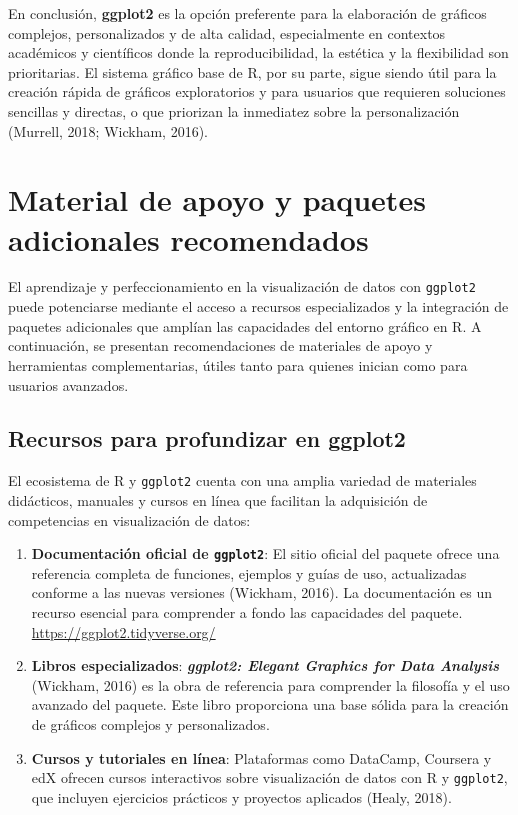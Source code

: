 \documentclass[
  spanish,
  a4paper,
  DIV=11,
  numbers=noendperiod,
  onepage,
  openany]{scrreprt}
\begin{document}
En conclusión, \textbf{ggplot2} es la opción preferente para la
elaboración de gráficos complejos, personalizados y de alta calidad,
especialmente en contextos académicos y científicos donde la
reproducibilidad, la estética y la flexibilidad son prioritarias. El
sistema gráfico base de R, por su parte, sigue siendo útil para la
creación rápida de gráficos exploratorios y para usuarios que requieren
soluciones sencillas y directas, o que priorizan la inmediatez sobre la
personalización (Murrell, 2018; Wickham, 2016).

\section{Material de apoyo y paquetes adicionales
recomendados}\label{material-de-apoyo-y-paquetes-adicionales-recomendados}

El aprendizaje y perfeccionamiento en la visualización de datos con
\texttt{ggplot2} puede potenciarse mediante el acceso a recursos
especializados y la integración de paquetes adicionales que amplían las
capacidades del entorno gráfico en R. A continuación, se presentan
recomendaciones de materiales de apoyo y herramientas complementarias,
útiles tanto para quienes inician como para usuarios avanzados.

\subsection{Recursos para profundizar en
ggplot2}\label{recursos-para-profundizar-en-ggplot2}

El ecosistema de R y \texttt{ggplot2} cuenta con una amplia variedad de
materiales didácticos, manuales y cursos en línea que facilitan la
adquisición de competencias en visualización de datos:

\begin{enumerate}
\def\labelenumi{\arabic{enumi}.}
\item
  \textbf{Documentación oficial de \texttt{ggplot2}}: El sitio oficial
  del paquete ofrece una referencia completa de funciones, ejemplos y
  guías de uso, actualizadas conforme a las nuevas versiones (Wickham,
  2016). La documentación es un recurso esencial para comprender a fondo
  las capacidades del paquete. \url{https://ggplot2.tidyverse.org/}
\item
  \textbf{Libros especializados}: \textbf{\emph{ggplot2: Elegant
  Graphics for Data Analysis}} (Wickham, 2016) es la obra de referencia
  para comprender la filosofía y el uso avanzado del paquete. Este libro
  proporciona una base sólida para la creación de gráficos complejos y
  personalizados.
\item
  \textbf{Cursos y tutoriales en línea}: Plataformas como DataCamp,
  Coursera y edX ofrecen cursos interactivos sobre visualización de
  datos con R y \texttt{ggplot2}, que incluyen ejercicios prácticos y
  proyectos aplicados (Healy, 2018).
\end{enumerate}
\end{document}
